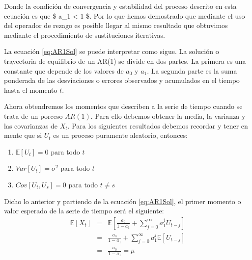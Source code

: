 \documentclass[
]{book}
\begin{document}
Donde la condición de convergencia y estabilidad del proceso descrito en esta ecuación es que \$ \textbar a\_1\textbar{} \textless{} 1 \$. Por lo que hemos demostrado que mediante el uso del operador de rezago es posible llegar al mismo resultado que obtuvimos mediante el procedimiento de sustituciones iterativas.

La ecuación \eqref{eq:AR1Sol} se puede interpretar como sigue. La solución o trayectoria de equilibrio de un AR(1) se divide en dos
partes. La primera es una constante que depende de los valores de \(a_0\) y \(a_1\). La segunda parte es la suma ponderada de las desviaciones o errores observados y acumulados en el tiempo hasta el momento \(t\).

Ahora obtendremos los momentos que describen a la serie de tiempo cuando se trata de un porceso \(AR(1)\). Para ello debemos obtener la media, la varianza y las covarianzas de \(X_t\). Para los siguientes resultados debemos recordar y tener en mente que si \(U_t\) es un proceso puramente aleatorio, entonces:

\begin{enumerate}
\def\labelenumi{\arabic{enumi}.}
\item
  \(\mathbb{E}[U_t] = 0\) para todo \(t\)
\item
  \(Var[U_t] = \sigma^2\) para todo \(t\)
\item
  \(Cov[U_t, U_s] = 0\) para todo \(t \neq s\)
\end{enumerate}

Dicho lo anterior y partiendo de la ecuación \eqref{eq:AR1Sol}, el primer momento o valor esperado de la serie de tiempo será el siguiente:
\begin{eqnarray}
    \mathbb{E}[X_t] & = & \mathbb{E} \left[ \frac{a_0}{1 - a_1} + \sum^{\infty}_{j = 0} a_1^j U_{t-j} \right] \nonumber \\
    & = & \frac{a_0}{1 - a_1} + \sum^{\infty}_{j = 0} a_1^j \mathbb{E}[U_{t-j}] \nonumber \\
    & = & \frac{a_0}{1 - a_1} = \mu
    \label{eq:AR1m1}
\end{eqnarray}
\end{document}
